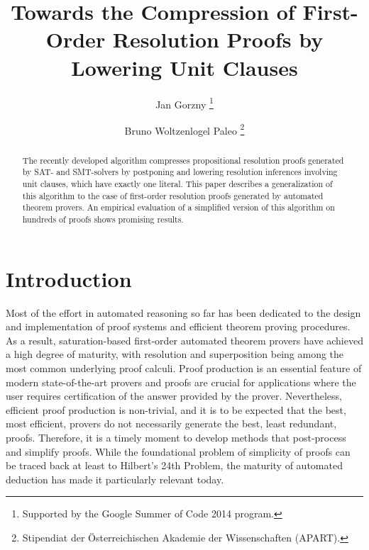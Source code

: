 \documentclass{llncs}
\title{Towards the Compression of First-Order Resolution Proofs by Lowering Unit Clauses}
\author{
  Jan Gorzny\inst{1}
  \thanks{Supported by the Google Summer of Code 2014 program.}
  \and 
  Bruno Woltzenlogel Paleo\inst{2}
  \thanks{Stipendiat der \"Osterreichischen Akademie der Wissenschaften (APART).}
}
\institute{
  \email{jgorzny@uvic.ca}, University of Victoria, Canada
  \and 
  \email{bruno@logic.at}, Vienna University of Technology, Austria
}
\begin{document}
\maketitle


\begin{abstract}
The recently developed {\LowerUnits} algorithm compresses
propositional resolution proofs generated by SAT- and SMT-solvers by postponing and lowering resolution inferences involving unit clauses, which have exactly one literal. This paper describes a generalization of this algorithm to the case of first-order resolution proofs generated by automated theorem provers. An empirical evaluation of a simplified version of this algorithm on hundreds of proofs shows promising results.
\end{abstract}


\setcounter{footnote}{0}

\section{Introduction}

Most of the effort in automated reasoning so far has been dedicated to the design and implementation of proof systems and efficient theorem proving procedures. As a result, saturation-based first-order automated theorem provers have achieved a high degree of maturity, with resolution and superposition being among the most common underlying proof calculi. Proof production is an essential feature of modern state-of-the-art provers and proofs are crucial for applications where the user requires certification of the answer provided by the prover. Nevertheless, efficient proof production is 
non-trivial,
and it is to be expected that the best, most efficient, provers do not necessarily generate the best, least redundant, proofs. Therefore, it is a timely moment to develop methods that post-process and simplify proofs. While the foundational problem of simplicity of proofs can be traced back at least to Hilbert's 24th Problem, the maturity of automated deduction has made it particularly relevant today.  
\end{document}
